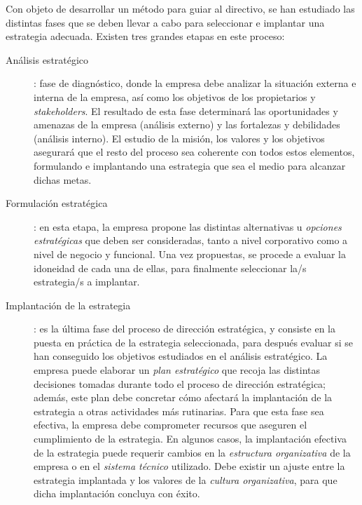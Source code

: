 \documentclass[10pt,a4paper,spanish]{report}
\begin{document}
            Con objeto de desarrollar un método para guiar al directivo, se han estudiado las distintas fases que se deben llevar a cabo para seleccionar e implantar una estrategia adecuada. Existen tres grandes etapas en este proceso:
            \begin{description}
                  \item[Análisis estratégico]: fase de diagnóstico, donde la empresa debe analizar la situación externa e interna de la empresa, así como los objetivos de los propietarios y \textit{\textcolor[rgb]{0.4,0.9,0.6}{stakeholders}}. El resultado de esta fase determinará las oportunidades y amenazas de la empresa (análisis externo) y las fortalezas y debilidades (análisis interno). El estudio de la misión, los valores y los objetivos asegurará que el resto del proceso sea coherente con todos estos elementos, formulando e implantando una estrategia que sea el medio para alcanzar dichas metas.
                  \item[Formulación estratégica]: en esta etapa, la empresa propone las distintas alternativas u \textit{\textcolor[rgb]{0.4,0.9,0.6}{opciones estratégicas}} que deben ser consideradas, tanto a nivel corporativo como a nivel de negocio y funcional. Una vez propuestas, se procede a evaluar la idoneidad de cada una de ellas, para finalmente seleccionar la/s estrategia/s a implantar.

                  \item[Implantación de la estrategia]: es la última fase del proceso de dirección estratégica, y consiste en la puesta en práctica de la estrategia seleccionada, para después evaluar si se han conseguido los objetivos estudiados en el análisis estratégico. La empresa puede elaborar un \textit{\textcolor[rgb]{0.4,0.9,0.6}{plan estratégico}} que recoja las distintas decisiones tomadas durante todo el proceso de dirección estratégica; además, este plan debe concretar cómo afectará la implantación de la estrategia a otras actividades más rutinarias. Para que esta fase sea efectiva, la empresa debe comprometer recursos que aseguren el cumplimiento de la estrategia. En algunos casos, la implantación efectiva de la estrategia puede requerir cambios en la \textit{\textcolor[rgb]{0.4,0.9,0.6}{estructura organizativa}} de la empresa o en el \textit{\textcolor[rgb]{0.4,0.9,0.6}{sistema técnico}} utilizado. Debe existir un ajuste entre la estrategia implantada y los valores de la \textit{\textcolor[rgb]{0.4,0.9,0.6}{cultura organizativa}}, para que dicha implantación concluya con éxito.
            \end{description}
\end{document}
